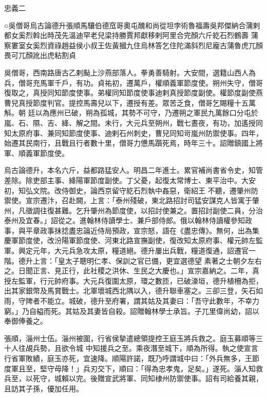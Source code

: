 
\begin{pinyinscope}

 忠義二



 ○吳僧哥烏古論德升張順馬驤伯德窊哥奧屯醜和尚從坦孛術魯福壽吳邦傑納合蒲剌都女奚烈斡出時茂先溫迪罕老兒梁持勝賈邦獻移剌阿里合完顏六斤紇石烈鶴壽
 蒲察婁室女奚烈資祿趙益侯小叔王佐黃摑九住烏林答乞住陀滿斜烈尼龐古蒲魯虎兀顏畏可兀顏訛出虎粘割貞



 吳僧哥，西南路唐古乙剌颭上沙燕部落人。拳勇善騎射。大安間，選籍山西人為兵，僧哥充馬軍千戶，有功。貞祐初，遷萬戶，權順義軍節度使。朔州失守，僧哥復取之，真授同知節度使事。弟權同知節度使事迪剌真授節度副使。權節度副使燕曹兒真授節度判官。提控馬壽兒以下，遷授有差。眾苦乏食，僧哥乞賜糧十五萬斛。朝
 廷以為應州已破，朔為孤城，其勢不可守，乃遷朔之軍民九萬餘口分屯於嵐、石、隰、吉、絳、解之間。未行，大元兵至朔州，戰七晝夜，有功，加遙授同知太原府事、兼同知節度使事、迪剌石州刺史，曹兒同知岢嵐州防禦使事。四年，始遷其民南行，且戰且行者數十里，僧哥力憊馬躓死焉，時年三十。詔贈鎮國上將軍、順義軍節度使。



 烏古論德升，本名六斤，益都路猛安人。明昌二年進士。累官補尚書省令史，知管差除。除吏部主事、絳陽軍節度副使。丁父憂，起復太常博士、東平治中。大安初，知弘文院。改侍御史，論西京留守紇石烈執中姦惡，衛紹王
 不聽，遷肇州防禦使。宣宗遷汴，召赴闕，上言：「泰州殘破，東北路招討司猛安謀克人皆寓于肇州，凡徵調往復甚難。乞升肇州為節度使，以招討使兼之。置招討副使二員，分治泰州及宜春。」詔從之。進翰林侍讀學士、兼戶部侍郎。俄以翰林侍讀權參知政事，與平章政事抹捻盡忠論近侍局預政，宣宗怒，語在《盡忠傳》。無何，出為集慶軍節度使，改汾陽軍節度使、河東北路宣撫副使，復改知太原府事、權元帥左監軍。興定元年，大元兵急攻太原，糧道絕。德升屢出兵戰，糧道復通，詔遷官一階。德升上言：「皇太子聰明仁孝、保訓之官已備，更宜選德望
 素著之士朝夕左右之。日聞正言、見正行，此社稷之洪休、生民之大慶也。」宣宗嘉納之。二年，真授左監軍，行元帥府事。大元兵復圍太原，環之數匝，已破濠垣，德升植柵為拒，出其家銀幣及馬賞戰士。北軍壞城西北隅以入，德升聯車塞之。三卻三登，矢石如雨，守陴者不能立。城破，德升至府署，謂其姑及其妻曰：「吾守此數年，不幸力窮。」乃自縊而死。其姑及其妻皆自殺。詔贈翰林學士承旨。子兀里偉尚幼，詔以奉御俸養之。



 張順，淄州士伍。淄州被圍，行省侯摯遣總領提控王庭玉將兵救之。庭玉募順等三十人往覘兵勢，且欲令城
 中知援兵之至。乘夜潛至城下，順為所得。執之使宣言行省軍敗績，庭玉亦死，宜速降。順陽許諾，既乃呼謂城中曰：「外兵無多，王節度軍且至，堅守毋降！」兵刃交下，順曰：「得為忠孝鬼，足矣。」遂死。淄人知救兵至，以死守，城賴以完。後贈宣武將軍、同知棣州防禦使事。詔有司給養其親，且訪其子孫，優加任用。




\end{pinyinscope}
